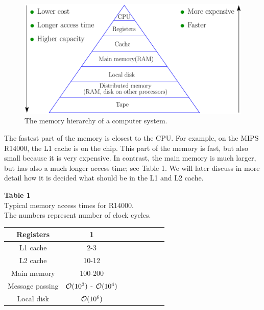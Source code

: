 \documentclass[11pt]{article}
\begin{document}
 \begin{figure}[htbp]
  \begin{center}
    \includegraphics[scale=0.65]{MemoryHierarchy}
  \end{center}
  \caption{The memory hierarchy of a computer system. 
}
\label{fig:MemoryHierarchy}
\end{figure}
\vspace{.5cm}

The fastest part of the memory is closest to the CPU. 
For example, on the MIPS R14000, the L1 cache is on the chip. 
This part of the memory is fast, but also small because it is very expensive. 
In contrast, the main memory is much larger, but has also a much longer access time; 
see Table 1. We will later discuss in more detail how it is decided what should 
be in the L1 and L2 cache. 


\begin{center}
{\bf Table 1} \\
Typical memory access times for R14000. \\
The numbers represent number of clock cycles. 
\end{center}
\begin{center}
\begin{tabular}{|c|c|c|c|c|c|c|c|} \hline
Registers & 1
  \\ \hline
L1 cache & 2-3
  \\ \hline
L2 cache & 10-12
  \\ \hline
Main memory &  100-200
  \\ \hline
Message passing & ${\cal O}(10^3)$ - ${\cal O}(10^4)$
\\ \hline
Local disk & ${\cal O}(10^6)$
  \\ \hline
\end{tabular}
\end{center}
\vspace{.2in}
\end{document}
